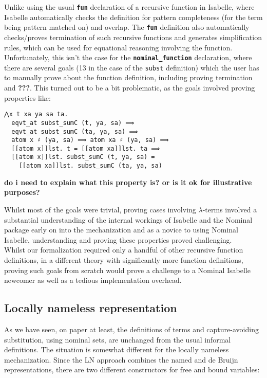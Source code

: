 \documentclass[a4paper, 12pt, twoside]{style/ociamthesis}
\theoremstyle{plain}
\theoremstyle{definition}
\theoremstyle{remark}
\begin{document}
Unlike using the usual \textbf{\texttt{fun}} declaration of a recursive
function in Isabelle, where Isabelle automatically checks the definition
for pattern completeness (for the term being pattern matched on) and
overlap. The \textbf{\texttt{fun}} definition also automatically
checks/proves termination of such recursive functions and generates
simplification rules, which can be used for equational reasoning
involving the function.\\
Unfortunately, this isn't the case for the
\textbf{\texttt{nominal\_function}} declaration, where there are several
goals (13 in the case of the \texttt{subst} definition) which the user
has to manually prove about the function definition, including proving
termination and \textbf{???}. This turned out to be a bit problematic,
as the goals involved proving properties like:

\begin{verbatim}
⋀x t xa ya sa ta.
  eqvt_at subst_sumC (t, ya, sa) ⟹
  eqvt_at subst_sumC (ta, ya, sa) ⟹
  atom x ♯ (ya, sa) ⟹ atom xa ♯ (ya, sa) ⟹ 
  [[atom x]]lst. t = [[atom xa]]lst. ta ⟹ 
  [[atom x]]lst. subst_sumC (t, ya, sa) = 
    [[atom xa]]lst. subst_sumC (ta, ya, sa)
\end{verbatim}

\textbf{do i need to explain what this property is? or is it ok for
illustrative purposes?}

Whilst most of the goals were trivial, proving cases involving
\(\lambda\)-terms involved a substantial understanding of the internal
workings of Isabelle and the Nominal package early on into the
mechanization and as a novice to using Nominal Isabelle, understanding
and proving these properties proved challenging.\\
Whilst our formalization required only a handful of other recursive
function definitions, in a different theory with significantly more
function definitions, proving such goals from scratch would prove a
challenge to a Nominal Isabelle newcomer as well as a tedious
implementation overhead.

\subsection{Locally nameless
representation}\label{locally-nameless-representation}

As we have seen, on paper at least, the definitions of terms and
capture-avoiding substitution, using nominal sets, are unchanged from
the usual informal definitions. The situation is somewhat different for
the locally nameless mechanization. Since the LN approach combines the
named and de Bruijn representations, there are two different
constructors for free and bound variables:
\end{document}
